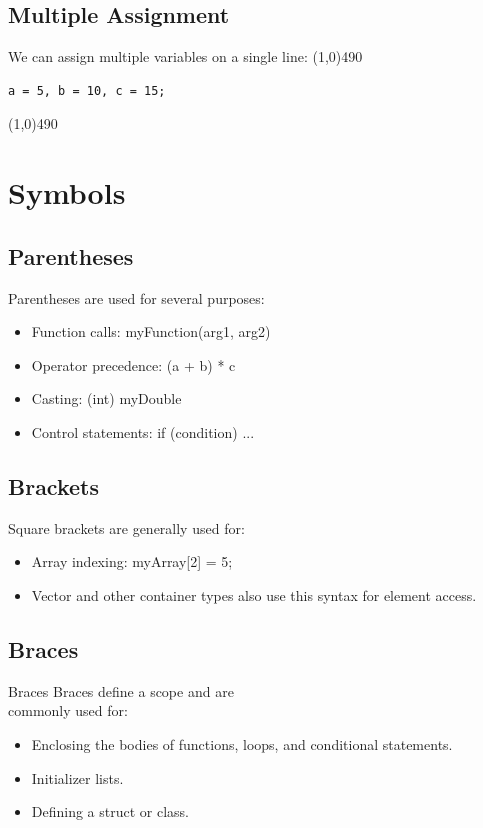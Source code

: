 \documentclass{report}
\begin{document}
    \subsection{Multiple Assignment}
    \bigbreak \noindent 
    We can assign multiple variables on a single line:
    \bigbreak \noindent 
    \line(1,0){490}
    \begin{verbatim}
a = 5, b = 10, c = 15;
    \end{verbatim}
    \line(1,0){490}

    \pagebreak \bigbreak \noindent 
    \section{\LARGE Symbols}
    \bigbreak \noindent 
    \begin{minipage}[t]{0.47\textwidth}
        \subsection{Parentheses}
        \bigbreak \noindent 
        Parentheses are used for several purposes:
        \begin{itemize}
            \item Function calls: myFunction(arg1, arg2)
            \item Operator precedence: (a + b) * c
            \item Casting: (int) myDouble
            \item Control statements: if (condition) { ... }
        \end{itemize}
    \end{minipage}
    \begin{minipage}[t]{0.47\textwidth}
    \subsection{Brackets}
    \bigbreak \noindent 
    Square brackets are generally used for:
    \begin{itemize}
        \item Array indexing: myArray[2] = 5;
        \item Vector and other container types also use this syntax for element access.
    \end{itemize}
    \end{minipage}
    \bigbreak \noindent \bigbreak \noindent 
    \begin{minipage}[t]{0.47\textwidth}
    \subsection{Braces}
    \bigbreak \noindent 
    Braces Braces define a scope and are \\ commonly used for:
    \begin{itemize}
        \item Enclosing the bodies of functions, loops, and conditional statements.
        \item Initializer lists.
        \item Defining a struct or class.
    \end{itemize}
    \end{minipage}
\end{document}
